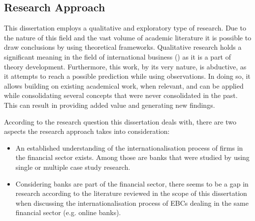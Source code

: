 \documentclass[11pt,a4paper]{article}
\begin{document}
{{\subsection{Research Approach} %
 \par
This dissertation employs a qualitative and exploratory type of research. Due to the nature of this field and the vast volume of academic literature it is possible to draw conclusions by using theoretical frameworks. Qualitative research holds a significant meaning in the field of international business (\cite{dozQualitativeResearchInternational2011}) as it is a part of theory development. Furthermore, this work, by its very nature, is abductive, as it attempts to reach a possible prediction while using observations. In doing so, it allows building on existing academical work, when relevant, and can be applied while consolidating several concepts that were never consolidated in the past. This can result in providing added value and generating new findings. \par %
According to the research question this dissertation deals with, there are two aspects the research approach takes into consideration:
\begin{itemize}
 \item {An established understanding of the internationalisation process of firms in the financial sector exists. Among those are banks that were studied by using single or multiple case study research.}
 \item{Considering banks are part of the financial sector, there seems to be a gap in research according to the literature reviewed in the scope of this dissertation when discussing the internationalisation process of EBCs dealing in the same financial sector (e.g. online banks). }
\end{itemize}


}}
\end{document}
